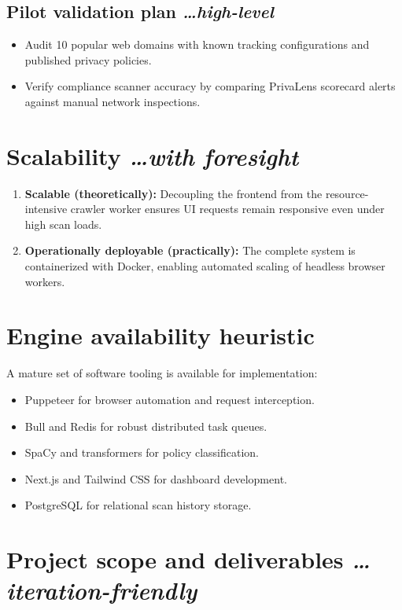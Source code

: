\documentclass[11pt,a4paper]{article}
\newcommand{\BvrHint}[1]{{\normalfont\normalsize\itshape\hfill #1}}
\begin{document}
\subsection{Pilot validation plan %
\BvrHint{\ldots high-level}}
\begin{itemize}[leftmargin=0.7cm]
    \item Audit 10 popular web domains with known tracking configurations and published privacy policies.
    \item Verify compliance scanner accuracy by comparing PrivaLens scorecard alerts against manual network inspections.
\end{itemize}

\section{Scalability %
\BvrHint{\ldots with foresight}}
\begin{enumerate}[leftmargin=0.7cm]
    \item \textbf{Scalable (theoretically):} Decoupling the frontend from the resource-intensive crawler worker ensures UI requests remain responsive even under high scan loads.
    \item \textbf{Operationally deployable (practically):} The complete system is containerized with Docker, enabling automated scaling of headless browser workers.
\end{enumerate}

\section{Engine availability heuristic}
A mature set of software tooling is available for implementation:
\begin{itemize}[leftmargin=0.7cm]
    \item Puppeteer for browser automation and request interception.
    \item Bull and Redis for robust distributed task queues.
    \item SpaCy and transformers for policy classification.
    \item Next.js and Tailwind CSS for dashboard development.
    \item PostgreSQL for relational scan history storage.
\end{itemize}

\section{Project scope and deliverables %
\BvrHint{\ldots iteration-friendly}}
\end{document}
